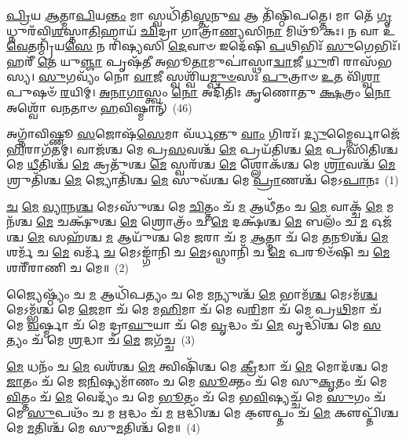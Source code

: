 \-\ul{𑌪𑍍𑌰𑌿}\-𑌯 \ul{𑌆}\-𑌤𑍍𑌮𑌾\-\ul{𑌪𑌿}\-𑌯\-\ul{𑌨𑍍𑌤𑌂} 𑌮𑌾 𑌸𑍍𑌵𑌧𑌿᳴𑌤𑌿\-\ul{𑌸𑍍𑌤}\-𑌨𑍁\-\ul{𑌵} 𑌆 𑌤𑌿᳴𑌷𑍍𑌠𑌿𑌪𑌤𑍍𑌤𑍇। 𑌮𑌾 𑌤𑍇᳴ \ul{𑌗𑍃}\-𑌧𑍍𑌨𑍁𑌰᳴𑌵𑌿\-\ul{𑌶}\-𑌸𑍍𑌤𑌾\-\ul{𑌤𑌿}\-𑌹𑌾𑌯᳴ \ul{𑌛𑌿}\-𑌦𑍍𑌰𑌾 𑌗𑌾𑌤𑍍𑌰𑌾᳴\-\ul{𑌣𑍍𑌯}\-𑌸𑌿\-\ul{𑌨𑌾} 𑌮𑌿𑌥𑍂᳴ 𑌕𑌃। 𑌨 𑌵𑌾 𑌉᳴ \ul{𑌵𑍇}\-𑌤𑌨𑍍𑌮𑍍𑌰𑌿᳴𑌯\-\ul{𑌸𑍇} 𑌨 𑌰𑌿᳴𑌷𑍍𑌯𑌸𑌿 \ul{𑌦𑍇}\-𑌵𑌾𑍞 𑌇𑌦𑍇᳴𑌷𑌿 \ul{𑌪}\-𑌥𑌿𑌭𑌿𑌃᳴ \ul{𑌸𑍁}\-𑌗𑍇𑌭𑌿𑌃᳴। 𑌹𑌰𑍀᳴ \ul{𑌤𑍇} 𑌯𑍁\-\ul{𑌞𑍍𑌜𑌾} 𑌪𑍃𑌷᳴𑌤𑍀 𑌅𑌭𑍂\-\ul{𑌤𑌾}\-𑌮𑍁𑌪𑌾॑𑌸𑍍𑌥𑌾\-\ul{𑌦𑍍𑌵𑌾}\-𑌜𑍀 \ul{𑌧𑍁}\-𑌰𑌿 𑌰𑌾𑌸᳴𑌭𑌸𑍍𑌯। \ul{𑌸𑍁}\-𑌗𑌵𑍍𑌯𑌂᳴ 𑌨𑍋 \ul{𑌵𑌾}\-𑌜𑍀 𑌸𑍍𑌵𑌶𑍍𑌵𑌿᳴𑌯\-\ul{𑌮𑍍𑌪𑍁}\-\-\ul{𑍞}\-𑌸𑌃 \ul{𑌪𑍁}\-𑌤𑍍𑌰𑌾𑍞 \ul{𑌉}\-𑌤 𑌵𑌿᳴\-\ul{𑌶𑍍𑌵𑌾}\-𑌪𑍁𑌷𑍞᳴ \ul{𑌰}\-𑌯𑌿𑌮𑍍। \ul{𑌅}\-\-\ul{𑌨𑌾}\-\-\ul{𑌗𑌾}\-𑌸𑍍𑌤𑍍𑌵𑌂 \ul{𑌨𑍋} 𑌅𑌦𑌿᳴𑌤𑌿𑌃 𑌕𑍃𑌣𑍋𑌤𑍁 \ul{𑌕𑍍𑌷}\-𑌤𑍍𑌰𑌂 \ul{𑌨𑍋} 𑌅𑌶𑍍𑌵𑍋᳴ 𑌵𑌨𑌤𑌾𑍞 \ul{𑌹}\-𑌵𑌿𑌷𑍍𑌮𑌾𑌨𑍍᳴~(46)


{\anuvakamend[{\-\ul{𑌘𑌾}\-𑌸𑌿𑌂 𑌕𑌶᳴𑌯𑌾 𑌤𑌪\-\ul{𑌦𑍍𑌰}\-𑌯𑌿𑌂 𑌨𑌵᳴ 𑌚}]}%

\setcounter{anuvakam}{0}
𑌅𑌗𑍍𑌨𑌾᳴𑌵𑌿𑌷𑍍𑌣𑍂 \ul{𑌸}\-𑌜𑍋𑌷᳴\-\ul{𑌸𑍇}\-𑌮𑌾 𑌵᳴𑌰𑍍𑌧𑌨𑍍𑌤𑍁 \ul{𑌵𑌾𑌂} 𑌗𑌿𑌰𑌃᳴। \ul{𑌦𑍍𑌯𑍁}\-𑌮𑍍𑌨𑍈𑌰𑍍𑌵𑌾𑌜𑍇᳴\-\ul{𑌭𑌿}\-𑌰𑌾𑌗᳴𑌤𑌮𑍍। 𑌵𑌾𑌜᳴𑌶𑍍𑌚 𑌮𑍇 𑌪𑍍𑌰\-\ul{𑌸}\-𑌵𑌶𑍍𑌚᳴ \ul{𑌮𑍇} 𑌪𑍍𑌰𑌯᳴𑌤𑌿𑌶𑍍𑌚 \ul{𑌮𑍇} 𑌪𑍍𑌰𑌸𑌿᳴𑌤𑌿𑌶𑍍𑌚 𑌮𑍇 \ul{𑌧𑍀}\-𑌤𑌿𑌶𑍍𑌚᳴ \ul{𑌮𑍇} 𑌕𑍍𑌰𑌤𑍁᳴𑌶𑍍𑌚 \ul{𑌮𑍇} 𑌸𑍍𑌵𑌰᳴𑌶𑍍𑌚 \ul{𑌮𑍇} 𑌶𑍍𑌲𑍋𑌕᳴𑌶𑍍𑌚 𑌮𑍇 \ul{𑌶𑍍𑌰𑌾}\-𑌵𑌶𑍍𑌚᳴ \ul{𑌮𑍇} 𑌶𑍍𑌰𑍁𑌤𑌿᳴𑌶𑍍𑌚 \ul{𑌮𑍇} 𑌜𑍍𑌯𑍋𑌤𑌿᳴𑌶𑍍𑌚 \ul{𑌮𑍇} 𑌸𑍁𑌵᳴𑌶𑍍𑌚 𑌮𑍇 \ul{𑌪𑍍𑌰𑌾}\-𑌣𑌶𑍍𑌚᳴ 𑌮𑍇\-𑌽\-\ul{𑌪𑌾}\-𑌨𑌃~(1)

\-\ul{𑌚} \ul{𑌮𑍇} \ul{𑌵𑍍𑌯𑌾}\-𑌨\-\ul{𑌶𑍍𑌚} 𑌮𑍇\-𑌽𑌸𑍁᳴𑌶𑍍𑌚 𑌮𑍇 \ul{𑌚𑌿}\-𑌤𑍍𑌤𑌂 𑌚᳴ \ul{𑌮} 𑌆𑌧𑍀᳴𑌤𑌂 𑌚 \ul{𑌮𑍇} 𑌵𑌾𑌕𑍍𑌚᳴ \ul{𑌮𑍇} 𑌮𑌨᳴𑌶𑍍𑌚 \ul{𑌮𑍇} 𑌚𑌕𑍍𑌷𑍁᳴𑌶𑍍𑌚 \ul{𑌮𑍇} 𑌶𑍍𑌰𑍋𑌤𑍍𑌰𑌂᳴ 𑌚 \ul{𑌮𑍇} 𑌦𑌕𑍍𑌷᳴𑌶𑍍𑌚 \ul{𑌮𑍇} 𑌬𑌲𑌂᳴ 𑌚 \ul{𑌮} 𑌓𑌜᳴𑌶𑍍𑌚 \ul{𑌮𑍇} 𑌸𑌹᳴𑌶𑍍𑌚 \ul{𑌮} 𑌆𑌯𑍁᳴𑌶𑍍𑌚 𑌮𑍇 \ul{𑌜}\-𑌰𑌾 𑌚᳴ 𑌮 \ul{𑌆}\-𑌤𑍍𑌮𑌾 𑌚᳴ 𑌮𑍇 \ul{𑌤}\-𑌨𑍂𑌶𑍍𑌚᳴ \ul{𑌮𑍇} 𑌶𑌰𑍍𑌮᳴ 𑌚 \ul{𑌮𑍇} 𑌵𑌰𑍍𑌮᳴ \ul{𑌚} 𑌮𑍇\-𑌽𑌙𑍍𑌗𑌾᳴𑌨𑌿 𑌚 \ul{𑌮𑍇}\-\-𑌽𑌸𑍍𑌥𑌾𑌨𑌿᳴ 𑌚 \ul{𑌮𑍇} 𑌪𑌰𑍂𑍞᳴𑌷𑌿 𑌚 \ul{𑌮𑍇} 𑌶𑌰𑍀᳴𑌰𑌾𑌣𑌿 𑌚 𑌮𑍇॥~(2)

{\anuvakamend[{\-\ul{𑌅}\-\-\ul{𑌪𑌾}\-𑌨\-\ul{𑌸𑍍𑌤}\-𑌨𑍂𑌶𑍍𑌚᳴ \ul{𑌮𑍇}\-\-𑌽𑌷𑍍𑌟𑌾𑌦᳴𑌶 𑌚}]}%

𑌜𑍍𑌯𑍈𑌷𑍍𑌠𑍍𑌯𑌂᳴ 𑌚 \ul{𑌮} 𑌆𑌧𑌿᳴𑌪𑌤𑍍𑌯𑌂 𑌚 𑌮𑍇 \ul{𑌮}\-𑌨𑍍𑌯𑍁𑌶𑍍𑌚᳴ \ul{𑌮𑍇} 𑌭𑌾𑌮᳴\-\ul{𑌶𑍍𑌚} 𑌮𑍇\-𑌽𑌮᳴\-\ul{𑌶𑍍𑌚} 𑌮𑍇\-𑌽𑌮𑍍𑌭᳴𑌶𑍍𑌚 𑌮𑍇 \ul{𑌜𑍇}\-𑌮𑌾 𑌚᳴ 𑌮𑍇 𑌮\-\ul{𑌹𑌿}\-𑌮𑌾 𑌚᳴ 𑌮𑍇 𑌵\-\ul{𑌰𑌿}\-𑌮𑌾 𑌚᳴ 𑌮𑍇 𑌪𑍍𑌰\-\ul{𑌥𑌿}\-𑌮𑌾 𑌚᳴ 𑌮𑍇 \ul{𑌵}\-𑌰𑍍𑌷𑍍𑌮𑌾 𑌚᳴ 𑌮𑍇 𑌦𑍍𑌰𑌾\-\ul{𑌘𑍁}\-𑌯𑌾 𑌚᳴ 𑌮𑍇 \ul{𑌵𑍃}\-𑌦𑍍𑌧𑌂 𑌚᳴ \ul{𑌮𑍇} 𑌵𑍃𑌦𑍍𑌧𑌿᳴𑌶𑍍𑌚 𑌮𑍇 \ul{𑌸}\-𑌤𑍍𑌯𑌂 𑌚᳴ 𑌮𑍇 \ul{𑌶𑍍𑌰}\-𑌦𑍍𑌧𑌾 𑌚᳴ \ul{𑌮𑍇} 𑌜𑌗᳴𑌚𑍍𑌚~(3)

\-\ul{𑌮𑍇} 𑌧𑌨𑌂᳴ 𑌚 \ul{𑌮𑍇} 𑌵𑌶᳴𑌶𑍍𑌚 \ul{𑌮𑍇} 𑌤𑍍𑌵𑌿𑌷𑌿᳴𑌶𑍍𑌚 𑌮𑍇 \ul{𑌕𑍍𑌰𑍀}\-𑌡𑌾 𑌚᳴ \ul{𑌮𑍇} 𑌮𑍋𑌦᳴𑌶𑍍𑌚 𑌮𑍇 \ul{𑌜𑌾}\-𑌤𑌂 𑌚᳴ 𑌮𑍇 𑌜\-\ul{𑌨𑌿}\-𑌷𑍍𑌯𑌮𑌾᳴𑌣𑌂 𑌚 𑌮𑍇 \ul{𑌸𑍂}\-𑌕𑍍𑌤𑌂 𑌚᳴ 𑌮𑍇 𑌸𑍁\-\ul{𑌕𑍃}\-𑌤𑌂 𑌚᳴ 𑌮𑍇 \ul{𑌵𑌿}\-𑌤𑍍𑌤𑌂 𑌚᳴ \ul{𑌮𑍇} 𑌵𑍇𑌦𑍍𑌯𑌂᳴ 𑌚 𑌮𑍇 \ul{𑌭𑍂}\-𑌤𑌂 𑌚᳴ 𑌮𑍇 𑌭\-\ul{𑌵𑌿}\-𑌷𑍍𑌯𑌚𑍍𑌚᳴ 𑌮𑍇 \ul{𑌸𑍁}\-𑌗𑌂 𑌚᳴ 𑌮𑍇 \ul{𑌸𑍁}\-𑌪𑌥𑌂᳴ 𑌚 𑌮 \ul{𑌋}\-𑌦𑍍𑌧𑌂 𑌚᳴ \ul{𑌮} 𑌋𑌦𑍍𑌧𑌿᳴𑌶𑍍𑌚 𑌮𑍇 𑌕𑍢॒𑌪𑍍𑌤𑌂 𑌚᳴ \ul{𑌮𑍇} 𑌕𑍢𑌪𑍍𑌤𑌿᳴𑌶𑍍𑌚 𑌮𑍇 \ul{𑌮}\-𑌤𑌿𑌶𑍍𑌚᳴ 𑌮𑍇 𑌸𑍁\-\ul{𑌮}\-𑌤𑌿𑌶𑍍𑌚᳴ 𑌮𑍇॥~(4)

